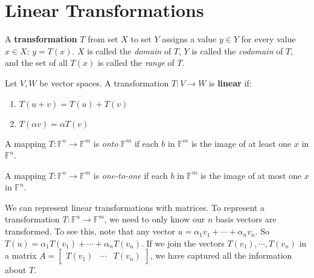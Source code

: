 \section{Linear Transformations}
\begin{definition}
A \textbf{transformation} $T$ from set $X$ to set $Y$ assigns a value $y \in Y$ for every value $x \in X$: $y = T(x)$. $X$ is called the \textit{domain} of $T$, $Y$ is called the \textit{codomain} of $T$, and the set of all $T(x)$ is called the \textit{range} of $T$. 

Let $V, W$ be vector spaces. A transformation $T: V \rightarrow W$ is \textbf{linear} if:
\begin{enumerate}
	\item $T(u + v) = T(u) + T(v)$
	\item $T(\alpha v) = \alpha T(v)$
\end{enumerate}

A mapping $T: \mathbb{F}^{n} \rightarrow \mathbb{F}^{m}$ is \textit{onto} $\mathbb{F}^{m}$ if each $b$ in $\mathbb{F}^{m}$ is the image of at least one $x$ in $\mathbb{F}^{n}$. 

A mapping $T: \mathbb{F}^{n} \rightarrow \mathbb{F}^{m}$ is \textit{one-to-one} if each $b$ in $\mathbb{F}^{m}$ is the image of at most one $x$ in $\mathbb{F}^{n}$. 
\end{definition}

We can represent linear transformations with matrices. To represent a transformation $T: \mathbb{F}^{n} \rightarrow \mathbb{F}^{m}$, we need to only know our $n$ basis vectors are transformed. To see this, note that any vector $u = \alpha_{1} v_{1} + \cdots + \alpha_{n} v_{n}$. So $T(u) = \alpha_{1} T(v_{1}) + \cdots + \alpha_{n} T(v_{n})$. If we join the vectors $T(v_{1}), \cdots, T(v_{n})$ in a matrix $A = \begin{bmatrix}
T(v_{1}) & \cdots & T(v_{n})
\end{bmatrix}$, we have captured all the information about $T$. 

